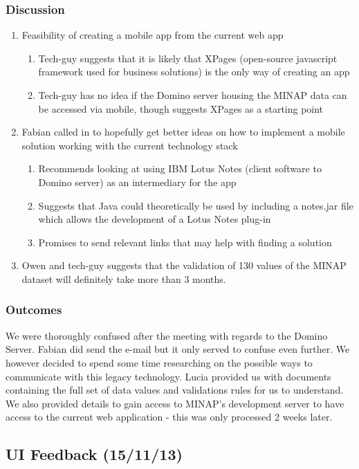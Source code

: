 \documentclass[12pt,a4paper,oneside,titlepage]{article}
\begin{document}
\subsubsection{Discussion}
\begin{enumerate}
	\item Feasibility of creating a mobile app from the current web app 
	\begin{enumerate}
	\item Tech-guy suggests that it is likely that XPages (open-source javascript framework used for business solutions) is the only way of creating an app 
	\item Tech-guy has no idea if the Domino server housing the MINAP data can be accessed via mobile, though suggests XPages as a starting point 
	\end{enumerate}
	\item Fabian called in to hopefully get better ideas on how to implement a mobile solution working with the current technology stack 
	\begin{enumerate}
	\item Recommends looking at using IBM Lotus Notes (client software to Domino server) as an intermediary for the app 
	\item Suggests that Java could theoretically be used by including a notes.jar file which allows the development of a Lotus Notes plug-in 
	\item Promises to send relevant links that may help with finding a solution 
	\end{enumerate}
	\item Owen and tech-guy suggests that the validation of 130 values of the MINAP dataset will definitely take more than 3 months.
\end{enumerate}
\subsubsection{Outcomes}
We were thoroughly confused after the meeting with regards to the Domino Server. Fabian did send the e-mail but it only served to confuse even further. We however decided to spend some time researching on the possible ways to communicate with this legacy technology. Lucia provided us with documents containing the full set of data values and validations rules for us to understand. We also provided details to gain access to MINAP’s development server to have access to the current web application - this was only processed 2 weeks later.

\subsection{UI Feedback (15/11/13)}
\end{document}

